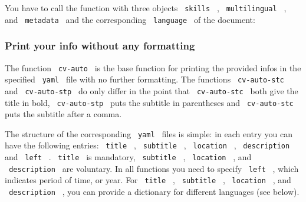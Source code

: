 You have to call the function with three objects \texttt{\ skills\ } ,
\texttt{\ multilingual\ } , and \texttt{\ metadata\ } and the
corresponding \texttt{\ language\ } of the document:

\begin{Shaded}
\begin{Highlighting}[]

\end{Highlighting}
\end{Shaded}

\subsubsection{Print your info without any
formatting}\label{print-your-info-without-any-formatting}

The function \texttt{\ cv-auto\ } is the base function for printing the
provided infos in the specified \texttt{\ yaml\ } file with no further
formatting. The functions \texttt{\ cv-auto-stc\ } and
\texttt{\ cv-auto-stp\ } do only differ in the point that
\texttt{\ cv-auto-stc\ } both give the title in bold,
\texttt{\ cv-auto-stp\ } puts the subtitle in parentheses and
\texttt{\ cv-auto-stc\ } puts the subtitle after a comma.

The structure of the corresponding \texttt{\ yaml\ } files is simple: in
each entry you can have the following entries: \texttt{\ title\ } ,
\texttt{\ subtitle\ } , \texttt{\ location\ } , \texttt{\ description\ }
and \texttt{\ left\ } . \texttt{\ title\ } is mandatory,
\texttt{\ subtitle\ } , \texttt{\ location\ } , and
\texttt{\ description\ } are voluntary. In all functions you need to
specify \texttt{\ left\ } , which indicates period of time, or year. For
\texttt{\ title\ } , \texttt{\ subtitle\ } , \texttt{\ location\ } , and
\texttt{\ description\ } , you can provide a dictionary for different
languages (see below).

